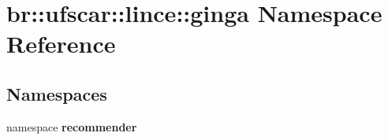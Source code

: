 \section{br::ufscar::lince::ginga Namespace Reference}
\label{namespacebr_1_1ufscar_1_1lince_1_1ginga}


\subsection*{Namespaces}
\begin{CompactItemize}
\item 
namespace {\bf recommender}
\end{CompactItemize}
